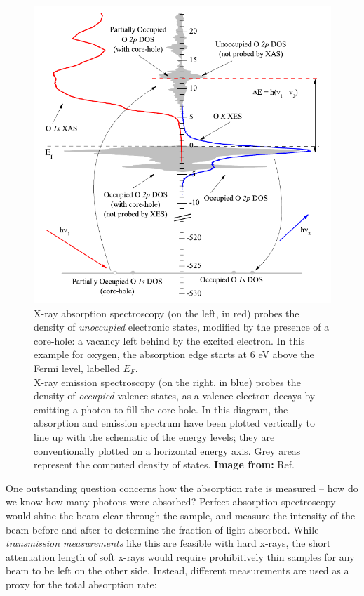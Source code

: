 \begin{figure}[htb] %
   \centering
   \includegraphics[scale=0.8]{../data/Chapter1/1i_sxsProcesses/1i.pdf} 
   \caption[X-ray absorption spectroscopy probes the density of \emph{unoccupied} electronic states, modified by the presence of a core-hole: a vacancy left behind by the excited electron.]{X-ray absorption spectroscopy (on the left, in red) probes the density of \emph{unoccupied} electronic states, modified by the presence of a core-hole: a vacancy left behind by the excited electron.  In this example for oxygen, the absorption edge starts at 6 eV above the Fermi level, labelled $E_F$.\\X-ray emission spectroscopy (on the right, in blue) probes the density of \emph{occupied} valence states, as a valence electron decays by emitting a photon to fill the core-hole.  In this diagram, the absorption and emission spectrum have been plotted vertically to line up with the schematic of the energy levels; they are conventionally plotted on a horizontal energy axis.  Grey areas represent the computed density of states.  \textbf{Image from: }Ref. \cite{McL10}}
   \label{1i}
\end{figure}

One outstanding question concerns how the absorption rate is measured -- how do we know how many photons were absorbed?  Perfect absorption spectroscopy would shine the beam clear through the sample, and measure the intensity of the beam before and after to determine the fraction of light absorbed.  While \emph{transmission measurements} like this are feasible with hard x-rays, the short attenuation length of soft x-rays would require prohibitively thin samples for any beam to be left on the other side.  Instead, different measurements are used as a proxy for the total absorption rate:
